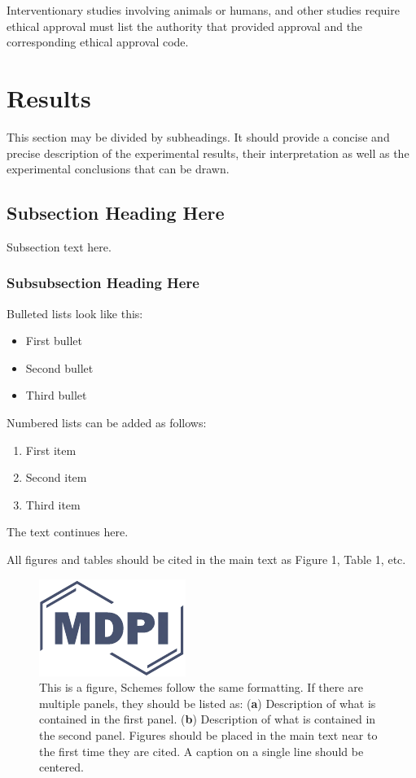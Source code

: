 \documentclass[ijerph,article,accept,moreauthors,pdftex]{mdpi}
\providecommand{\tightlist}{%
  \setlength{\itemsep}{0pt}\setlength{\parskip}{4pt}}
\begin{document}
Interventionary studies involving animals or humans, and other studies
require ethical approval must list the authority that provided approval
and the corresponding ethical approval code.

\hypertarget{results}{%
\section{Results}\label{results}}

This section may be divided by subheadings. It should provide a concise
and precise description of the experimental results, their
interpretation as well as the experimental conclusions that can be
drawn.

\hypertarget{subsection-heading-here}{%
\subsection{Subsection Heading Here}\label{subsection-heading-here}}

Subsection text here.

\hypertarget{subsubsection-heading-here}{%
\subsubsection{Subsubsection Heading
Here}\label{subsubsection-heading-here}}

Bulleted lists look like this:

\begin{itemize}
\tightlist
\item
  First bullet
\item
  Second bullet
\item
  Third bullet
\end{itemize}

Numbered lists can be added as follows:

\begin{enumerate}
\def\labelenumi{\arabic{enumi}.}
\tightlist
\item
  First item
\item
  Second item
\item
  Third item
\end{enumerate}

The text continues here.

All figures and tables should be cited in the main text as Figure 1,
Table 1, etc.

\begin{figure}[H]
\centering
\includegraphics[width=3 cm]{logo-mdpi}
\caption{This is a figure, Schemes follow the same formatting. If there are multiple panels, they should be listed as: (\textbf{a}) Description of what is contained in the first panel. (\textbf{b}) Description of what is contained in the second panel. Figures should be placed in the main text near to the first time they are cited. A caption on a single line should be centered.}
\end{figure}
\end{document}
